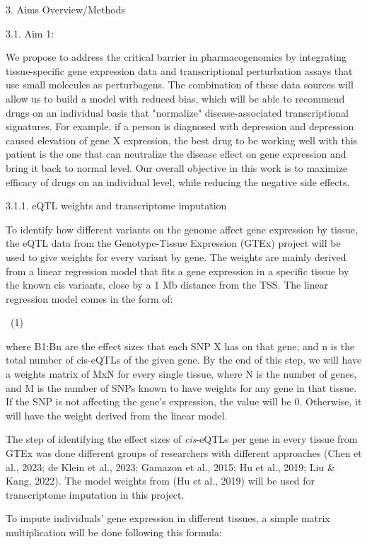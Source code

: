 \documentclass[
]{article}
\begin{document}
3. Aims Overview/Methods

3.1. Aim 1:{~}

We propose to address the critical barrier in pharmacogenomics by
integrating tissue-specific gene expression data and transcriptional
perturbation assays that use small molecules as perturbagens. The
combination of these data sources will allow us to build a model with
reduced bias, which will be able to recommend drugs on an individual
basis that "normalize" disease-associated transcriptional signatures.
For example, if a person is diagnosed with depression and depression
caused elevation of gene X expression, the best drug to be working well
with this patient is the one that can neutralize the disease effect on
gene expression and bring it back to normal level. Our overall objective
in this work is to maximize efficacy of drugs on an individual level,
while reducing the negative side effects.

3.1.1. eQTL weights and transcriptome imputation

To identify how different variants on the genome affect gene expression
by tissue, the eQTL data from the Genotype-Tissue Expression (GTEx)
project will be used to give weights for every variant by gene. The
weights are mainly derived from a linear regression model that fits a
gene expression in a specific tissue by the known cis variants, close by
a 1 Mb distance from the TSS. The linear regression model comes in the
form of:{~}

{~}(1)

where B1:Bn are the effect sizes that each SNP X has on that gene, and n
is the total number of cis-eQTLs of the given gene. By the end of this
step, we will have a weights matrix of MxN for every single tissue,
where N is the number of genes, and M is the number of SNPs known to
have weights for any gene in that tissue. If the SNP is not affecting
the gene's expression, the value will be 0. Otherwise, it will have the
weight derived from the linear model.{~}

The step of identifying the effect sizes of \emph{cis}-eQTLs per gene in
every tissue from GTEx was done different groups of researchers with
different approaches (Chen et al., 2023; de Klein et al., 2023; Gamazon
et al., 2015; Hu et al., 2019; Liu \& Kang, 2022). The model weights
from (Hu et al., 2019) will be used for transcriptome imputation in this
project.{~}

To impute individuals' gene expression in different tissues, a simple
matrix multiplication will be done following this formula:{~}
\end{document}

